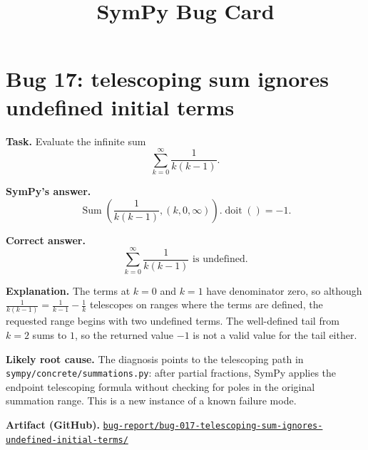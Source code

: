 \documentclass[11pt]{article}
\title{SymPy Bug Card}
\date{}
\newcommand{\artifactrepo}{https://github.com/TODO-org/TODO-repo}
\newcommand{\bugbundle}[1]{\href{\artifactrepo/tree/main/bug-report/#1}{\nolinkurl{bug-report/#1/}}}
\begin{document}
\author{}
\maketitle

\section*{Bug 17: telescoping sum ignores undefined initial terms}

\begin{counterexamplebox}
\textbf{Task.} Evaluate the infinite sum
\[
\sum_{k=0}^{\infty} \frac{1}{k(k-1)}.
\]

\medskip
\textbf{SymPy's answer.}
\[
\operatorname{Sum}\!\left(\frac{1}{k(k-1)},(k,0,\infty)\right).\operatorname{doit}()=-1.
\]

\medskip
\textbf{Correct answer.}
\[
\sum_{k=0}^{\infty} \frac{1}{k(k-1)} \text{ is undefined.}
\]

\medskip
\textbf{Explanation.} The terms at \(k=0\) and \(k=1\) have denominator zero, so although \(\frac{1}{k(k-1)}=\frac{1}{k-1}-\frac{1}{k}\) telescopes on ranges where the terms are defined, the requested range begins with two undefined terms. The well-defined tail from \(k=2\) sums to \(1\), so the returned value \(-1\) is not a valid value for the tail either.

\medskip
\textbf{Likely root cause.} The diagnosis points to the telescoping path in \nolinkurl{sympy/concrete/summations.py}: after partial fractions, SymPy applies the endpoint telescoping formula without checking for poles in the original summation range. This is a new instance of a known failure mode. 

\medskip
\textbf{Artifact (GitHub).} \bugbundle{bug-017-telescoping-sum-ignores-undefined-initial-terms}
\end{counterexamplebox}
\end{document}

